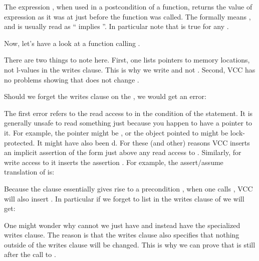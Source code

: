 
\noindent
The expression , when used in a postcondition of a function,
returns the value of expression 
as it was at just before the function was called.
The  formally means , and is usually 
read as `` implies ''.
In particular note that  is true for any .

Now, let's have a look at a function calling .


There are two things to note here.
First, one lists pointers to memory locations, not l-values in the writes
clause.
This is why we write  and not .
Second, VCC has no problems showing that  does not change
.

Should we forget the writes clause on the , we would get an error:


\noindent
The first error refers to the read access to  in the condition of the
 statement.
It is generally unsafe to read something just because you happen to have a pointer to it.
For example, the pointer might be , or the object pointed to might be lock-protected.
It might have also been d.
For these (and other) reasons VCC inserts an implicit assertion of the form
 just above any read access to .
Similarly, for write access to  it inserts the assertion
.
For example, the assert/assume translation of  is:


\noindent
Because the clause  essentially gives rise to a precondition
, when one calls ,
VCC will also insert .
In particular if we forget to list  in the writes
clause of  we will get:


One might wonder why cannot we just have 
 and instead have the specialized writes clause.
The reason is that the writes clause also specifies that nothing
outside of the writes clause will be changed.
This is why we can prove that  is still  after the call
to . 




